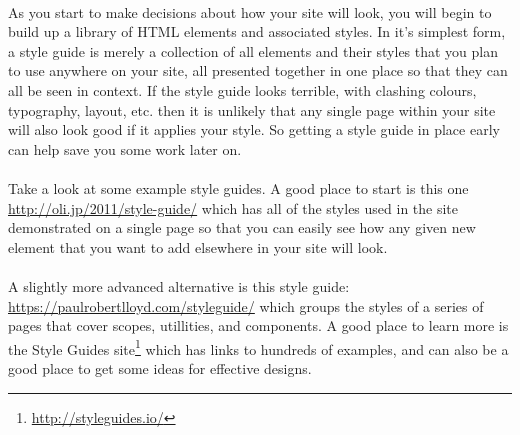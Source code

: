 \documentclass[10pt, a4paper, twosize]{article}
\begin{document}
\paragraph{} As you start to make decisions about how your site will look, you will begin to build up a library of HTML elements and associated styles. In it's simplest form, a style guide is merely a collection of all elements and their styles that you plan to use anywhere on your site, all presented together in one place so that they can all be seen in context. If the style guide looks terrible, with clashing colours, typography, layout, etc. then it is unlikely that any single page within your site will also look good if it applies your style. So getting a style guide in place early can help save you some work later on.

\paragraph{} Take a look at some example style guides. A good place to start is this one \url{http://oli.jp/2011/style-guide/} which has all of the styles used in the site demonstrated on a single page so that you can easily see how any given new element that you want to add elsewhere in your site will look.

\paragraph{} A slightly more advanced alternative is this style guide: \url{https://paulrobertlloyd.com/styleguide/} which groups the styles of a series of pages that cover scopes, utillities, and components. A good place to learn more is the Style Guides site\footnote{\url{http://styleguides.io/}} which has links to hundreds of examples, and can also be a good place to get some ideas for effective designs.
\end{document}
